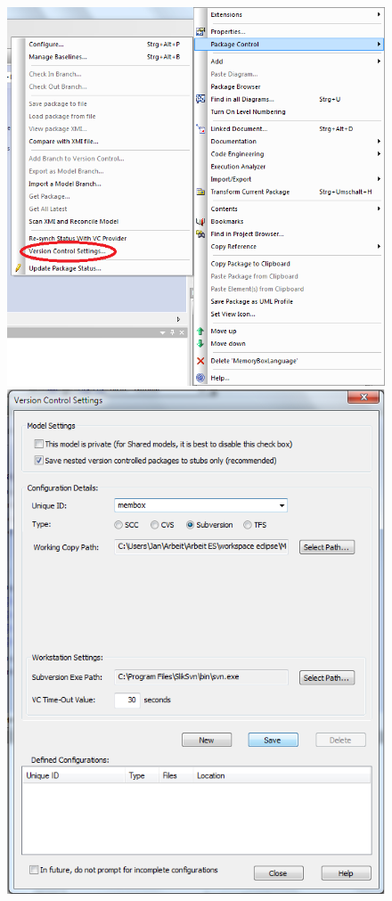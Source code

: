 \begin{figure}[htbp]
\begin{center}
	\includegraphics[height=0.45\textheight]{pics/advancedTopics/eaSVN/rightclick.png}\\	
	\vspace{0.5 cm}
	\includegraphics[height=0.45\textheight]{pics/advancedTopics/eaSVN/versioncontrol.png}

\end{center}
\end{figure}
